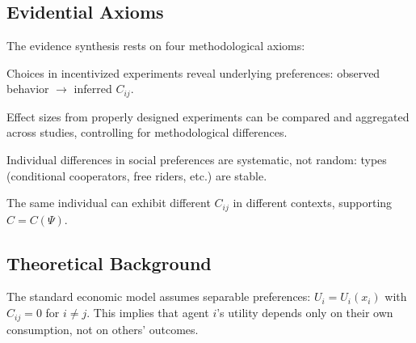 
\subsection{Evidential Axioms}
\label{sec:EV-axioms}

The evidence synthesis rests on four methodological axioms:

\begin{axiom}
\label{ax:EV-A1}
Choices in incentivized experiments reveal underlying preferences:
observed behavior $\rightarrow$ inferred $C_{ij}$.
\end{axiom}

\begin{axiom}
\label{ax:EV-A2}
Effect sizes from properly designed experiments can be compared and
aggregated across studies, controlling for methodological differences.
\end{axiom}

\begin{axiom}
\label{ax:EV-A3}
Individual differences in social preferences are systematic, not random:
types (conditional cooperators, free riders, etc.) are stable.
\end{axiom}

\begin{axiom}
\label{ax:EV-A4}
The same individual can exhibit different $C_{ij}$ in different contexts,
supporting $C = C(\Psi)$.
\end{axiom}



\subsection{Theoretical Background}

The standard economic model assumes separable preferences: $U_i = U_i(x_i)$
with $C_{ij} = 0$ for $i \neq j$. This implies that agent $i$'s utility depends
only on their own consumption, not on others' outcomes.

